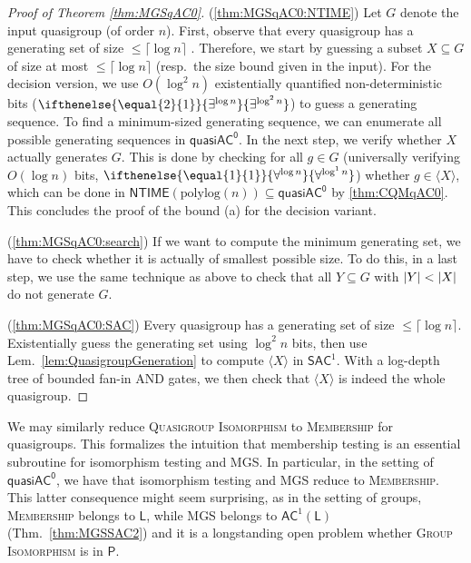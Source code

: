 \documentclass{article}
\newcommand{\algprobm}[1]{\textsc{#1}\xspace}
\newcommand{\betacc}[1]{\ifthenelse{\equal{#1}{1}}{\exists^{\log n}}{\exists^{\log^{#1}n}}} %
\newcommand{\alphacc}[1]{\ifthenelse{\equal{#1}{1}}{\forall^{\log n}}{\forall^{\log^{#1}n}}} %
\newcommand{\abs}[1]{\left|\mathinner{#1}\right|}
\newcommand{\Lem}[1]{Lem.~\ref{#1}\xspace}
\newcommand{\Thm}[1]{Thm.~\ref{#1}\xspace}
\newcommand*{\ComplexityClass}[1]{\ensuremath{\mathsf{#1}}\xspace}
\newcommand*{\LogSpace}{\ComplexityClass{L}}
\newcommand{\SAC}{\ComplexityClass{SAC}}
\newcommand{\qACz}{\ComplexityClass{quasiAC^0}}
\newcommand{\NTIME}{\ComplexityClass{NTIME}}
\begin{document}
\begin{proof}[Proof of Theorem \ref{thm:MGSqAC0}]

(\ref{thm:MGSqAC0:NTIME}) Let $G$ denote the input quasigroup (of order $n$). First, observe that every quasigroup has a generating set of size $\leq \lceil \log n \rceil$ \cite{MillerTarjan}. Therefore, we start by guessing a subset $X\subseteq G$ of size at most $\leq \lceil \log n \rceil$ (resp.\ the size bound given in the input). For the decision version, we use $O(\log^2 n)$ existentially quantified non-deterministic bits ($\betacc{2}$) to guess a generating sequence. To find a minimum-sized generating sequence,  we can enumerate all possible generating sequences in $\qACz$. In the next step, we verify whether $X$ actually generates $G$. This is done by checking for all $g \in G$ (universally verifying $O(\log n)$ bits, $\alphacc{1}$) whether $g \in \langle X \rangle$, which can be done in $\NTIME(\mathrm{polylog}(n)) \subseteq \qACz$ by \cref{thm:CQMqAC0}. This concludes the proof of the bound (a) for the decision variant. 

(\ref{thm:MGSqAC0:search}) If we want to compute the minimum generating set, we have to check whether it is actually of smallest possible size. To do this, in a last step, we use the same technique as above to check that all $Y \subseteq G $ with $\abs{Y} < \abs{X}$ do not generate $G$.

(\ref{thm:MGSqAC0:SAC}) Every quasigroup has a generating set of size $\leq \lceil \log n \rceil$. Existentially guess the generating set using $\log^2 n$ bits, then use \Lem{lem:QuasigroupGeneration} to compute $\langle X \rangle$ in $\SAC^1$. With a log-depth tree of bounded fan-in AND gates, we then check that $\langle X \rangle$ is indeed the whole quasigroup. 
\end{proof}



\begin{remark}
We may similarly reduce \algprobm{Quasigroup Isomorphism} to \algprobm{Membership} for quasigroups. This formalizes the intuition that membership testing is an essential subroutine for isomorphism testing and \algprobm{MGS}. In particular, in the setting of $\qACz$, we have that isomorphism testing and \algprobm{MGS} reduce to \algprobm{Membership}. This latter consequence might seem surprising, as in the setting of groups, \algprobm{Membership} belongs to $\LogSpace$, while \algprobm{MGS} belongs to $\mathsf{AC}^{1}(\mathsf{L})$ (\Thm{thm:MGSSAC2}) and it is a longstanding open problem whether \algprobm{Group Isomorphism} is in $\mathsf{P}$.
\end{remark}
\fi
\end{document}
